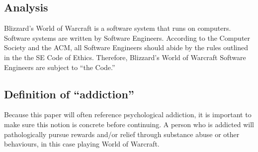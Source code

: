 \documentclass[11pt]{article}
\begin{document}
\begin{multicols}{2}


\section{Analysis}

Blizzard's World of Warcraft is a software system that runs on computers. \cite{WoWSystemReqs} Software systems are written by Software Engineers. \cite{ACMApprovesSECode} According to the Computer Society and the ACM, all Software Engineers should abide by the rules outlined in the the SE Code of Ethics. \cite{ACMApprovesSECode}\cite{SECode} Therefore, Blizzard's World of Warcraft Software Engineers are subject to “the Code.” \cite{SECode}

\subsection{Definition of ``addiction''}
Because this paper will often reference psychological addiction, it is important to make sure this notion is concrete before continuing.
A person who is addicted will pathologically pursue rewards and/or relief through substance abuse or other behaviours, in this case playing World of Warcraft. \cite{DefinitionOfAddiction}


\end{multicols}
\end{document}
